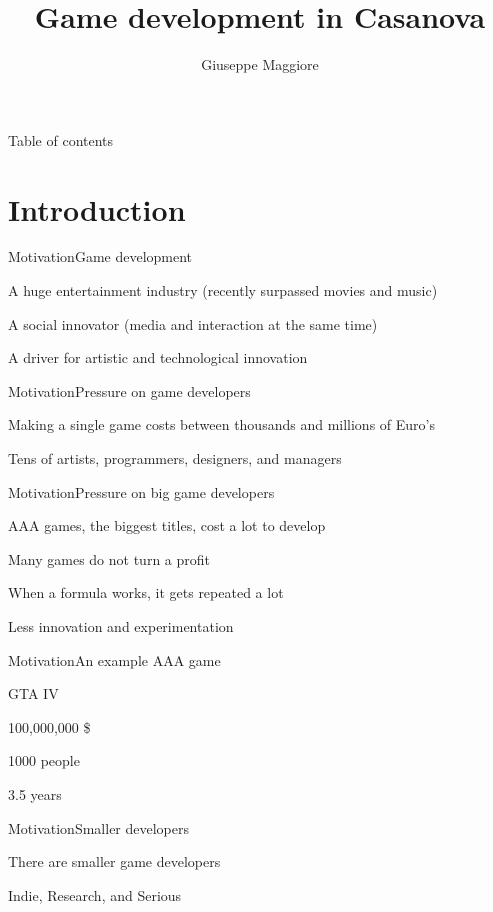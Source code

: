 \documentclass{beamer}
\title{Game development in Casanova}
\author{Giuseppe Maggiore}
\institute{Università Ca' Foscari - Venezia, Italy \\ NHTV University - Breda, Netherlands}
\date{}
\begin{document}
\maketitle

\begin{frame}{Table of contents}
\tableofcontents
\end{frame}

\section{Introduction}
\begin{slide}{Motivation}{Game development}{
\item A huge entertainment industry (recently surpassed movies and music)
\item A social innovator (media and interaction at the same time)
\item A driver for artistic and technological innovation
}\end{slide}

\begin{slide}{Motivation}{Pressure on game developers}{
\item Making a single game costs between thousands and millions of Euro's
\item Tens of artists, programmers, designers, and managers
}\end{slide}

\begin{slide}{Motivation}{Pressure on big game developers}{
\item AAA games, the biggest titles, cost a lot to develop
\item Many games do not turn a profit
\item When a formula works, it gets repeated a lot
\item Less innovation and experimentation
}\end{slide}

\begin{slide}{Motivation}{An example AAA game}{
\item GTA IV
\item 100,000,000 \$
\item 1000 people
\item 3.5 years
}\end{slide}

\begin{slide}{Motivation}{Smaller developers}{
\item There are smaller game developers
\item Indie, Research, and Serious
}\end{slide}
\end{document}
